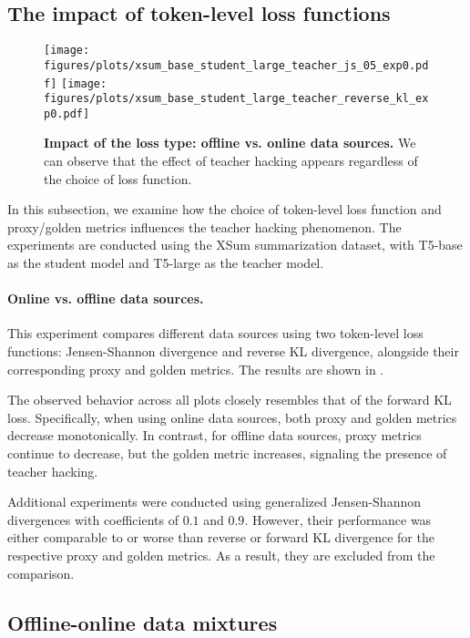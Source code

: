 \subsection{The impact of token-level loss functions}


\begin{figure}[ht]
    \centering
    \texttt{[image: figures/plots/xsum\_base\_student\_large\_teacher\_js\_05\_exp0.pdf]}
    \texttt{[image: figures/plots/xsum\_base\_student\_large\_teacher\_reverse\_kl\_exp0.pdf]}
    \caption{\textbf{Impact of the loss type: offline vs. online data sources.} 
    We can observe that the effect of teacher hacking appears regardless of the choice of loss function.
    }
    \label{fig:losses_exp_large_to_base_online_fwd_kl}
\end{figure}

In this subsection, we examine how the choice of token-level loss function and proxy/golden metrics influences the teacher hacking phenomenon. The experiments are conducted using the XSum summarization dataset, with T5-base as the student model and T5-large as the teacher model.

\paragraph{Online vs. offline data sources.}
This experiment compares different data sources using two token-level loss functions: Jensen-Shannon divergence and reverse KL divergence, alongside their corresponding proxy and golden metrics. The results are shown in .

The observed behavior across all plots closely resembles that of the forward KL loss. Specifically, when using online data sources, both proxy and golden metrics decrease monotonically. In contrast, for offline data sources, proxy metrics continue to decrease, but the golden metric increases, signaling the presence of teacher hacking.

Additional experiments were conducted using generalized Jensen-Shannon divergences with coefficients of $0.1$ and $0.9$. However, their performance was either comparable to or worse than reverse or forward KL divergence for the respective proxy and golden metrics. As a result, they are excluded from the comparison.


\subsection{Offline-online data mixtures}

